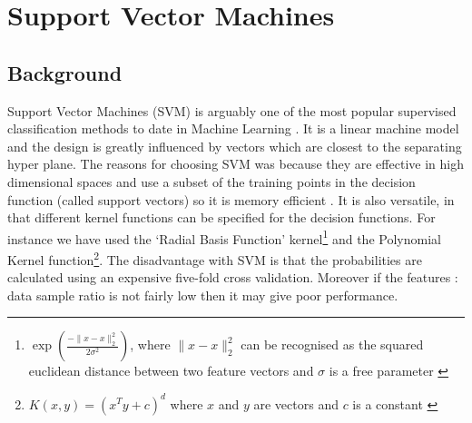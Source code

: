 \newpage
\section{Support Vector Machines}

\subsection{Background}
Support Vector Machines (SVM) is arguably one of the most popular supervised classification methods to date in Machine Learning \cite{31}. It is a linear machine model and the design is greatly influenced by vectors which are closest to the separating hyper plane. The reasons for choosing SVM was because they are effective in high dimensional spaces and use a subset of the training points in the decision function (called support vectors) so it is memory efficient \cite{31}. It is also versatile, in that different kernel functions can be specified for the decision functions. For instance we have used the `Radial Basis Function' kernel\footnote{$\exp(\frac{-\parallel x - x \parallel^2_2}{2\sigma^2})$,  where $\parallel x - x \parallel^2_2$ can be recognised as the squared euclidean distance between two feature vectors and $\sigma$ is a free parameter \cite{33}} and the Polynomial Kernel function\footnote{$K(x,y) = (x^Ty + c)^d$ where $x$ and $y$ are vectors and $c$ is a constant \cite{35}}. The disadvantage with SVM is that the probabilities are calculated using an expensive five-fold cross validation. Moreover if the features : data sample ratio is not fairly low then it may give poor performance. 
